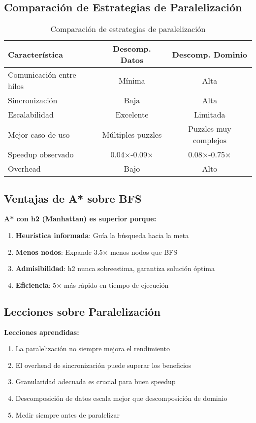 \documentclass[12pt,a4paper]{article}
\begin{document}
\subsection{Comparación de Estrategias de Paralelización}

\begin{table}[h]
\centering
\caption{Comparación de estrategias de paralelización}
\begin{tabular}{@{}lcc@{}}
\toprule
\textbf{Característica} & \textbf{Descomp. Datos} & \textbf{Descomp. Dominio} \\
\midrule
Comunicación entre hilos & Mínima & Alta \\
Sincronización & Baja & Alta \\
Escalabilidad & Excelente & Limitada \\
Mejor caso de uso & Múltiples puzzles & Puzzles muy complejos \\
Speedup observado & 0.04×-0.09× & 0.08×-0.75× \\
Overhead & Bajo & Alto \\
\bottomrule
\end{tabular}
\end{table}

\subsection{Ventajas de A* sobre BFS}

\textbf{A* con h2 (Manhattan) es superior porque:}
\begin{enumerate}
    \item \textbf{Heurística informada}: Guía la búsqueda hacia la meta
    \item \textbf{Menos nodos}: Expande 3.5× menos nodos que BFS
    \item \textbf{Admisibilidad}: h2 nunca sobreestima, garantiza solución óptima
    \item \textbf{Eficiencia}: 5× más rápido en tiempo de ejecución
\end{enumerate}

\subsection{Lecciones sobre Paralelización}

\textbf{Lecciones aprendidas:}
\begin{enumerate}
    \item La paralelización no siempre mejora el rendimiento
    \item El overhead de sincronización puede superar los beneficios
    \item Granularidad adecuada es crucial para buen speedup
    \item Descomposición de datos escala mejor que descomposición de dominio
    \item Medir siempre antes de paralelizar
\end{enumerate}
\end{document}

